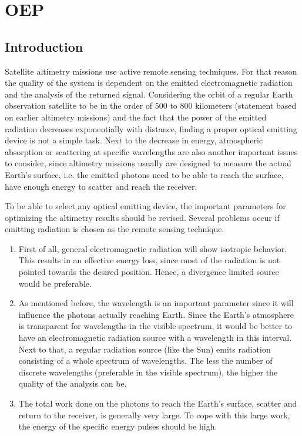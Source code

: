 \section{\acl{OEP}}
\label{designOptionsEmitter}
\subsection{Introduction}
Satellite altimetry missions use active remote sensing techniques. For that reason the quality of the system is dependent on the emitted electromagnetic radiation and the analysis of the returned signal. Considering the orbit of a regular Earth observation satellite to be in the order of 500 to 800 kilometers (statement based on earlier altimetry missions) and the fact that the power of the emitted radiation decreases exponentially with distance, finding a proper optical emitting device is not a simple task. Next to the decrease in energy, atmospheric absorption or scattering at specific wavelengths are also another important issues to consider, since altimetry missions usually are designed to measure the actual Earth's surface, i.e. the emitted photons need to be able to reach the surface, have enough energy to scatter and reach the receiver.

To be able to select any optical emitting device, the important parameters for optimizing the altimetry results should be revised. Several problems occur if emitting radiation is chosen as the remote sensing technique. 
\begin{enumerate}[i]
	\item First of all, general electromagnetic radiation will show isotropic behavior. This results in an effective energy loss, since most of the radiation is not pointed towards the desired position. Hence, a divergence limited source would be preferable.
	\item As mentioned before, the wavelength is an important parameter since it will influence the photons actually reaching Earth. Since the Earth's atmosphere is transparent for wavelengths in the visible spectrum, it would be better to have an electromagnetic radiation source with a wavelength in this interval. Next to that, a regular radiation source (like the Sun) emits radiation consisting of a whole spectrum of wavelengths. The less the number of discrete wavelengths (preferable in the visible spectrum), the higher the quality of the analysis can be.
	\item The total work done on the photons to reach the Earth's surface, scatter and return to the receiver, is generally very large. To cope with this large work, the energy of the specific energy pulses should be high.  
\end{enumerate}

